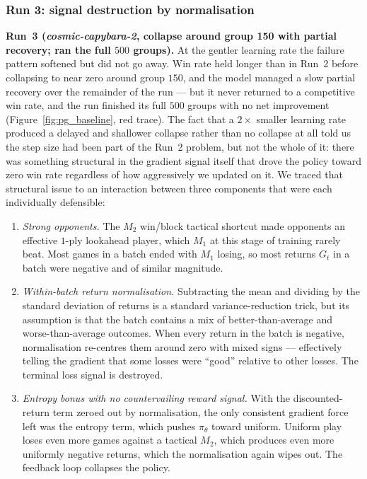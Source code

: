 \documentclass[11pt]{article}
\begin{document}
\subsubsection{Run 3: signal destruction by normalisation}
\label{sssec:pg_run3}

\textbf{Run~3 (\emph{cosmic-capybara-2}, collapse around group 150
with partial recovery; ran the full $500$ groups).} At the gentler
learning rate the failure pattern softened but did not go away. Win
rate held longer than in Run~2 before collapsing to near zero around
group $150$, and the model managed a slow partial recovery over the
remainder of the run --- but it never returned to a competitive win
rate, and the run finished its full $500$ groups with no net
improvement (Figure~\ref{fig:pg_baseline}, red trace). The fact that
a $2\times$ smaller learning rate produced a delayed and shallower
collapse rather than no collapse at all told us the step size had
been part of the Run~2 problem, but not the whole of it: there was
something structural in the gradient signal itself that drove the
policy toward zero win rate regardless of how aggressively we updated
on it. We traced that structural issue to an interaction between
three components that were each individually defensible:

\begin{enumerate}
    \item \emph{Strong opponents.} The $M_2$ win/block tactical
    shortcut made opponents an effective $1$-ply lookahead player,
    which $M_1$ at this stage of training rarely beat. Most games in a
    batch ended with $M_1$ losing, so most returns $G_t$ in a batch
    were negative and of similar magnitude.
    \item \emph{Within-batch return normalisation.} Subtracting the
    mean and dividing by the standard deviation of returns is a
    standard variance-reduction trick, but its assumption is that the
    batch contains a mix of better-than-average and worse-than-average
    outcomes. When every return in the batch is negative, normalisation
    re-centres them around zero with mixed signs --- effectively
    telling the gradient that some losses were ``good'' relative to
    other losses. The terminal loss signal is destroyed.
    \item \emph{Entropy bonus with no countervailing reward signal.}
    With the discounted-return term zeroed out by normalisation, the
    only consistent gradient force left was the entropy term, which
    pushes $\pi_\theta$ toward uniform. Uniform play loses even more
    games against a tactical $M_2$, which produces even more uniformly
    negative returns, which the normalisation again wipes out. The
    feedback loop collapses the policy.
\end{enumerate}
\end{document}
